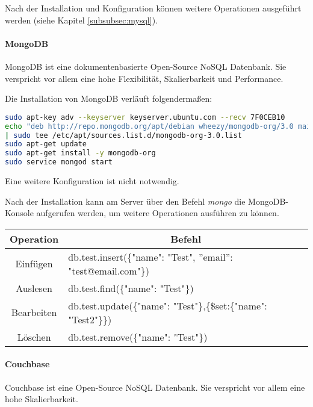 Nach der Installation und Konfiguration können weitere Operationen ausgeführt werden (siehe Kapitel \ref{subsubsec:mysql}).

\newpage

\paragraph{MongoDB}
MongoDB ist eine dokumentenbasierte Open-Source NoSQL Datenbank. Sie verspricht vor allem eine hohe Flexibilität, Skalierbarkeit und Performance. \cite{ABOUTMONGODB}

Die Installation von MongoDB verläuft folgendermaßen:
\begin{lstlisting}[caption=Installation von MongoDB \cite{MONGODBINSTALL}, language=bash]
sudo apt-key adv --keyserver keyserver.ubuntu.com --recv 7F0CEB10
echo "deb http://repo.mongodb.org/apt/debian wheezy/mongodb-org/3.0 main" 
| sudo tee /etc/apt/sources.list.d/mongodb-org-3.0.list
sudo apt-get update
sudo apt-get install -y mongodb-org
sudo service mongod start
\end{lstlisting}
Eine weitere Konfiguration ist nicht notwendig.

Nach der Installation kann am Server über den Befehl \textit{mongo}  die MongoDB-Konsole aufgerufen werden, um weitere Operationen ausführen zu können.

\begin{table}[htb]
\def\arraystretch{1.3}
\centering
\begin{tabular}{|c|l|}
\hline
\textbf{Operation} & \multicolumn{1}{c|}{\textbf{Befehl}}                            \\ \hline
Einfügen           & db.test.insert(\{"name": "Test", ''email'': "test@email.com"\})                    \\ \hline
Auslesen           & db.test.find(\{"name": "Test"\}) \\ \hline
Bearbeiten         & db.test.update(\{"name": "Test"\},\{\$set:\{"name": "Test2"\}\}) \\ \hline
Löschen            & db.test.remove(\{"name": "Test"\}) \\ \hline
\end{tabular}
\end{table}

\newpage

\paragraph{Couchbase}
Couchbase ist eine Open-Source NoSQL Datenbank. Sie verspricht vor allem eine hohe Skalierbarkeit.\cite{ABOUTCOUCHBASE}

